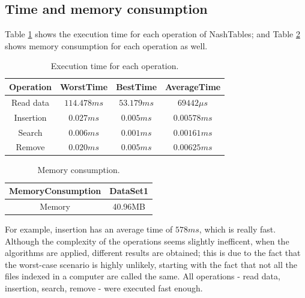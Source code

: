 \documentclass{sig-alternate-05-2015}
\begin{document}
  \subsection{Time and memory consumption}
  Table \ref{tab:exTime} shows the execution time for each operation of NashTables; and Table \ref{table:mem} shows
  memory consumption for each operation as well.
  \begin{table}
    \small
    \centering
    \caption{Execution time for each operation.}
    \label{tab:exTime}
    \begin{tabular}{cccc}
      \hline
      \textbf{Operation} & \textbf{WorstTime} & 	\textbf{BestTime} & \textbf{AverageTime} \\ \hline
      Read data          & $114.478ms$      & $53.179ms$      & $69442\mu s$         \\
      Insertion          & $0.027ms$               & $0.005ms$               & $0.00578ms$               \\
      Search             & $0.006ms$               & $0.001ms$              & $0.00161ms$               \\
      Remove             & $0.020ms$              & $0.005ms$              & $0.00625ms$              \\ \hline
    \end{tabular}
  \end{table}
  \begin{table}[b]
    \centering
    \caption{Memory consumption.}
    \label{table:mem}
    \begin{tabular}{cc}
      \hline\rule{0pt}{2ex}
      \textbf{MemoryConsumption} & \textbf{DataSet1} \\ \hline\rule{0pt}{2ex}
      Memory                     & 40.96MB           \\ \hline
    \end{tabular}
  \end{table}
  For example, insertion has an average time of $578ms$, which is really fast. Although the complexity of the operations
  seems slightly inefficent, when the algorithms are applied, different results are obtained; this is due to the fact that
  the worst-case scenario is highly unlikely, starting with the fact that not all the files indexed in a computer are called the
  same. All operations - read data, insertion, search, remove - were executed fast enough.

  
  
\end{document}
